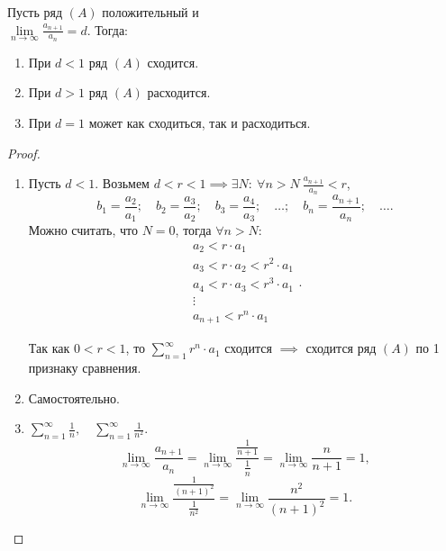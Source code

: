 \begin{theorem}
    Пусть ряд $(A)$ положительный и  \\ $ \underset{n\rightarrow\infty}{\lim}\frac{a_{n+1}}{a_n} = d $. Тогда:
    \begin{enumerate}
        \item При $d < 1$ ряд $(A)$ сходится.
        \item При $d > 1$ ряд $(A)$ расходится.
        \item При $d = 1$ может как сходиться, так и расходиться.
    \end{enumerate}
\end{theorem}

\begin{proof}\leavevmode
    \begin{enumerate}
        \item Пусть $d < 1$. Возьмем $d < r < 1 \implies \exists N: \ \forall n > N \ \frac{a_{n+1}}{a_n}<r $,
              \[
                  b_1 = \frac{a_2}{a_1}; \quad b_2 = \frac{a_3}{a_2}; \quad b_3 = \frac{a_4}{a_3}; \quad \ldots; \quad b_n = \frac{a_{n+1}}{a_n}; \quad \ldots.
              \]
              Можно считать, что $N=0$, тогда $\forall n > N$:
              \[
                  \begin{array}{l}
                      a_2 < r \cdot a_1                 \\
                      a_3 < r \cdot a_2 < r^2 \cdot a_1 \\
                      a_4 < r \cdot a_3 < r^3 \cdot a_1 \\
                      \vdots                            \\
                      a_{n+1} < r^n \cdot a_1
                  \end{array}.
              \]

              Так как $0 < r < 1$, то $\sum_{n=1}^{\infty} r^n \cdot a_1$ сходится $\implies$ сходится ряд $(A)$ по 1 признаку сравнения.
        \item Самостоятельно.
        \item $\sum_{n=1}^{\infty}\frac{1}{n}, \quad \sum_{n=1}^{\infty}\frac{1}{n^2}$.
              \[
                  \underset{n\rightarrow\infty}{\lim}\frac{a_{n+1}}{a_n} = \underset{n\rightarrow\infty}{\lim}\frac{\frac{1}{n+1}}{\frac{1}{n}} = \underset{n\rightarrow\infty}{\lim}\frac{n}{n+1} = 1,
              \]
              \[
                  \underset{n\rightarrow\infty}{\lim}\frac{\frac{1}{(n+1)^2}}{\frac{1}{n^2}} = \underset{n\rightarrow\infty}{\lim}\frac{n^2}{(n+1)^2} = 1.
              \]
    \end{enumerate}
\end{proof}